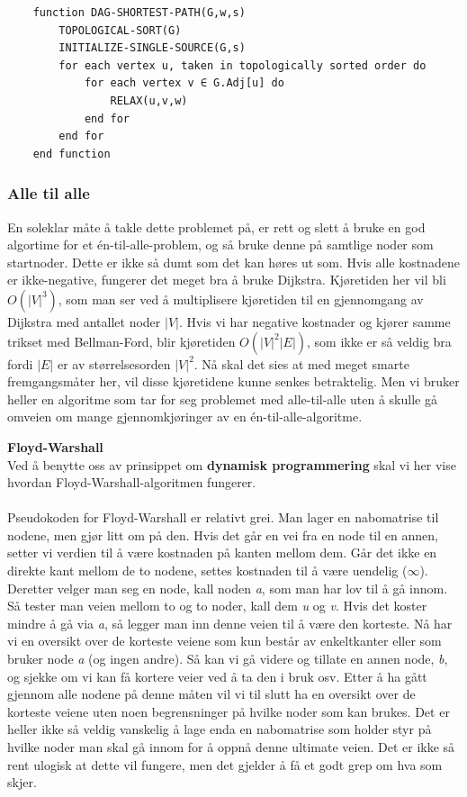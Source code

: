 \begin{lstlisting}
    function DAG-SHORTEST-PATH(G,w,s)
    	TOPOLOGICAL-SORT(G)
    	INITIALIZE-SINGLE-SOURCE(G,s)
    	for each vertex u, taken in topologically sorted order do
    		for each vertex v ∈ G.Adj[u] do
    			RELAX(u,v,w)
    		end for
    	end for
    end function

\end{lstlisting}

\subsubsection{Alle til alle}
En soleklar måte å takle dette problemet på, er rett og slett å bruke en god algortime for et én-til-alle-problem, og så bruke denne på samtlige noder som startnoder. Dette er ikke så dumt som det kan høres ut som. Hvis alle kostnadene er ikke-negative, fungerer det meget bra å bruke Dijkstra. Kjøretiden her vil bli $O(|V|^3)$, som man ser ved å multiplisere kjøretiden til en gjennomgang av Dijkstra med antallet noder $|V|$. Hvis vi har negative kostnader og kjører samme trikset med Bellman-Ford, blir kjøretiden $O(|V|^2 |E|)$, som ikke er så veldig bra fordi $|E|$ er av størrelsesorden $|V|^2$. Nå skal det sies at med meget smarte fremgangsmåter her, vil disse kjøretidene kunne senkes betraktelig. Men vi bruker heller en algoritme som tar for seg problemet med alle-til-alle uten å skulle gå omveien om mange gjennomkjøringer av en én-til-alle-algoritme.

\textbf{Floyd-Warshall}\\
Ved å benytte oss av prinsippet om \textbf{dynamisk programmering} skal vi her vise hvordan Floyd-Warshall-algoritmen fungerer.
\\\\
Pseudokoden for Floyd-Warshall er relativt grei. Man lager en nabomatrise til nodene, men gjør litt om på den. Hvis det går en vei fra en node til en annen, setter vi verdien til å være kostnaden på kanten mellom dem. Går det ikke en direkte kant mellom de to nodene, settes kostnaden til å være uendelig ($\infty$). Deretter velger man seg en node, kall noden \textit{a}, som man har lov til å gå innom. Så tester man veien mellom to og to noder, kall dem \textit{u} og \textit{v}. Hvis det koster mindre å gå via \textit{a}, så legger man inn denne veien til å være den korteste. Nå har vi en oversikt over de korteste veiene som kun består av enkeltkanter eller som bruker node \textit{a} (og ingen andre). Så kan vi gå videre og tillate en annen node, \textit{b}, og sjekke om vi kan få kortere veier ved å ta den i bruk osv. Etter å ha gått gjennom alle nodene på denne måten vil vi til slutt ha en oversikt over de korteste veiene uten noen begrensninger på hvilke noder som kan brukes. Det er heller ikke så veldig vanskelig å lage enda en nabomatrise som holder styr på hvilke noder man skal gå innom for å oppnå denne ultimate veien. Det er ikke så rent ulogisk at dette vil fungere, men det gjelder å få et godt grep om hva som skjer.


